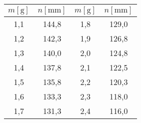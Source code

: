 \begin{tabular}{cccc}                                                                                   \toprule
$ m [\si{\gram}]$   &   $n [\si{\milli\metre}]$ &   $ m [\si{\gram}]$   &   $n [\si{\milli\metre}]$ \\  \midrule
1,1                 &   144,8                   &   1,8                 &   129,0                   \\  
1,2                 &   142,3                   &   1,9                 &   126,8                   \\
1,3                 &   140,0                   &   2,0                 &   124,8                   \\
1,4                 &   137,8                   &   2,1                 &   122,5                   \\
1,5                 &   135,8                   &   2,2                 &   120,3                   \\
1,6                 &   133,3                   &   2,3                 &   118,0                   \\
1,7                 &   131,3                   &   2,4                 &   116,0                   \\  \bottomrule
\end{tabular}
